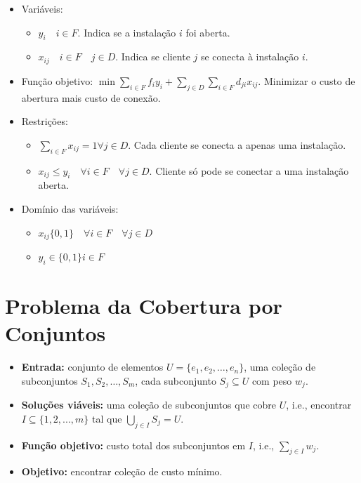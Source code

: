 \begin{itemize}
    \item Variáveis:
    \begin{itemize}
        \item $y_i \quad i \in F$. Indica se a instalação $i$ foi aberta.
        \item $x_{ij} \quad i \in F \quad j \in D$. Indica se cliente $j$ se conecta à instalação $i$.
    \end{itemize}
    \item Função objetivo: $\min\sum_{i \in F} f_iy_i + \sum_{j\in D}\sum_{i \in F} d_{ji}x_{ij}$. Minimizar o custo de abertura mais custo de conexão.
    \item Restrições:
    \begin{itemize}
        \item $\sum_{i \in F}x_{ij}=1 \forall j \in D$. Cada cliente se conecta a apenas uma instalação.
        \item $x_{ij}\leq y_i \quad \forall i \in F \quad \forall j \in D$. Cliente só pode se conectar a uma instalação aberta.
    \end{itemize}
    \item Domínio das variáveis:
    \begin{itemize}
        \item $x_{ij} \{0,1\} \quad \forall i \in F \quad \forall j \in D$
        \item $y_i \in \{0,1\} i \in F$
    \end{itemize}
\end{itemize}

\section{Problema da Cobertura por Conjuntos}
\label{sec:cobertura_conjuntos}

\begin{itemize}
    \item \textbf{Entrada:} conjunto de elementos $U = \{e_1,e_2,\dots,e_n\}$, uma coleção de subconjuntos $S_1,S_2,\dots,S_m$, cada subconjunto $S_j \subseteq U$ com peso $w_j$.
    \item \textbf{Soluções viáveis:} uma coleção de subconjuntos que cobre $U$, i.e., encontrar $I \subseteq \{1,2,...,m\}$ tal que $\bigcup_{j \in I} S_j = U$.
    \item \textbf{Função objetivo:} custo total dos subconjuntos em $I$, i.e., $\sum_{j \in I}w_j$.
    \item \textbf{Objetivo:} encontrar coleção de custo mínimo.
\end{itemize}


